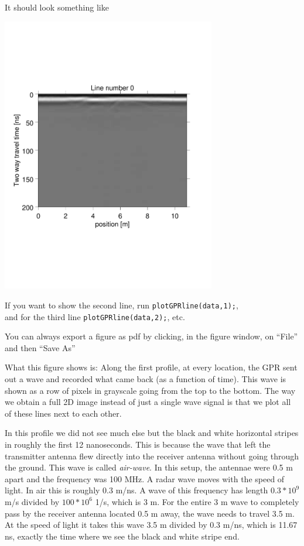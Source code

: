 \documentclass[11pt]{article}
\begin{document}
It should look something like
\begin{center}
\includegraphics[width=0.7\textwidth, trim = 0.9cm 6cm 2cm
  6.5cm,clip]{figures/GPRline0}
\end{center}


If you want to show the second line, run \verb#plotGPRline(data,1);#,
\\and for the third line \verb#plotGPRline(data,2);#, etc.
 
You can always export a figure as pdf by clicking, in the figure
window, on ``File'' and then ``Save As''

What this figure shows is: Along the first profile, at every location,
the GPR sent out a wave and recorded what came back (as a function of
time). This wave is shown as a row of pixels in grayscale going from
the top to the bottom. The way we obtain a full 2D image instead of
just a single wave signal is that we plot all of these lines next to
each other.

In this profile we did not see much else but the black and white
horizontal stripes in roughly the first 12 nanoseconds. This is
because the wave that left the transmitter antenna flew directly into
the receiver antenna without going through the ground. This wave is
called \emph{air-wave}. In this setup, the antennae were 0.5 m apart
and the frequency was 100 MHz. A radar wave moves with the speed of
light. In air this is roughly 0.3 m/ns. A wave of this frequency has
length $0.3*10^9$ m/s divided by $100*10^6$ 1/s, which is 3 m. For the
entire 3 m wave to completely pass by the receiver antenna located 0.5
m away, the wave needs to travel 3.5 m. At the speed of light it takes this
wave 3.5 m divided by 0.3 m/ns, which is 11.67 ns, exactly the time
where we see the black and white stripe end.
\end{document}
